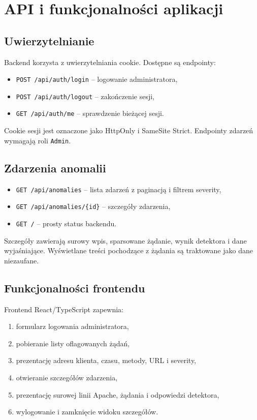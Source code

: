 \documentclass[12pt,a4paper]{article}
\newcommand{\code}[1]{\texttt{#1}}
\begin{document}
\section{API i funkcjonalności aplikacji}

\subsection{Uwierzytelnianie}

Backend korzysta z uwierzytelniania cookie. Dostępne są endpointy:
\begin{itemize}
    \item \code{POST /api/auth/login} -- logowanie administratora,
    \item \code{POST /api/auth/logout} -- zakończenie sesji,
    \item \code{GET /api/auth/me} -- sprawdzenie bieżącej sesji.
\end{itemize}

Cookie sesji jest oznaczone jako HttpOnly i SameSite Strict. Endpointy zdarzeń
wymagają roli \code{Admin}.

\subsection{Zdarzenia anomalii}

\begin{itemize}
    \item \code{GET /api/anomalies} -- lista zdarzeń z paginacją i filtrem severity,
    \item \code{GET /api/anomalies/\{id\}} -- szczegóły zdarzenia,
    \item \code{GET /} -- prosty status backendu.
\end{itemize}

Szczegóły zawierają surowy wpis, sparsowane żądanie, wynik detektora i dane
wyjaśniające. Wyświetlane treści pochodzące z żądania są traktowane jako dane
niezaufane.

\subsection{Funkcjonalności frontendu}

Frontend React/TypeScript zapewnia:
\begin{enumerate}
    \item formularz logowania administratora,
    \item pobieranie listy oflagowanych żądań,
    \item prezentację adresu klienta, czasu, metody, URL i severity,
    \item otwieranie szczegółów zdarzenia,
    \item prezentację surowej linii Apache, żądania i odpowiedzi detektora,
    \item wylogowanie i zamknięcie widoku szczegółów.
\end{enumerate}
\end{document}
